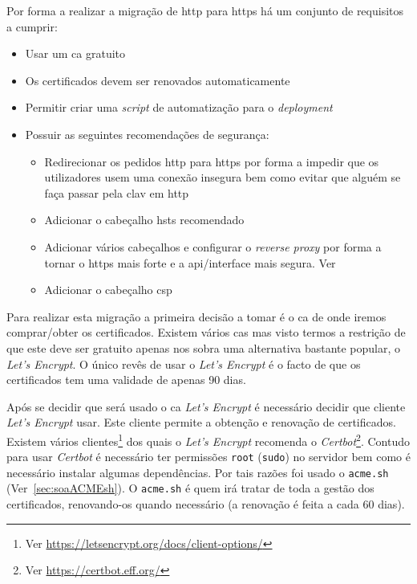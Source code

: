 Por forma a realizar a migração de \acrshort{http} para \acrshort{https} há um conjunto de requisitos a cumprir:\label{sec:sol_httpsReq}
\begin{itemize}
    \item Usar um \acrshort{ca} gratuito
    \item Os certificados devem ser renovados automaticamente
    \item Permitir criar uma \textit{script} de automatização para o \textit{deployment}
    \item Possuir as seguintes recomendações de segurança:
    \begin{itemize}
        \item Redirecionar os pedidos \acrshort{http} para \acrshort{https} por forma a impedir que os utilizadores usem uma conexão insegura bem como evitar que alguém se faça passar pela \acrshort{clav} em \acrshort{http}
        \item Adicionar o cabeçalho \acrshort{hsts} recomendado~\cite{hsts,hsts2}
        \item Adicionar vários cabeçalhos e configurar o \textit{reverse proxy} por forma a tornar o \acrshort{https} mais forte e a \acrshort{api}/interface mais segura. Ver~\cite{helmet,letEnA+,dhparams,secExpress,strongSSL}
        \item Adicionar o cabeçalho \acrfull{csp}~\cite{helmetCSP,csp}
    \end{itemize}
\end{itemize}


Para realizar esta migração a primeira decisão a tomar é o \acrfull{ca} de onde iremos comprar/obter os certificados. Existem vários \acrshort{ca}s mas visto termos a restrição de que este deve ser gratuito apenas nos sobra uma alternativa bastante popular, o \textit{Let's Encrypt}. O único revês de usar o \textit{Let's Encrypt} é o facto de que os certificados tem uma validade de apenas 90 dias.

Após se decidir que será usado o \acrshort{ca} \textit{Let's Encrypt} é necessário decidir que cliente \textit{Let's Encrypt} usar. Este cliente permite a obtenção e renovação de certificados. Existem vários clientes\footnote{Ver \url{https://letsencrypt.org/docs/client-options/}} dos quais o \textit{Let's Encrypt} recomenda o \textit{Certbot}\footnote{Ver \url{https://certbot.eff.org/}}. Contudo para usar \textit{Certbot} é necessário ter permissões \texttt{root} (\texttt{sudo}) no servidor bem como é necessário instalar algumas dependências. Por tais razões foi usado o \texttt{acme.sh} (Ver~\ref{sec:soaACMEsh}). O \texttt{acme.sh} é quem irá tratar de toda a gestão dos certificados, renovando-os quando necessário (a renovação é feita a cada 60 dias).

